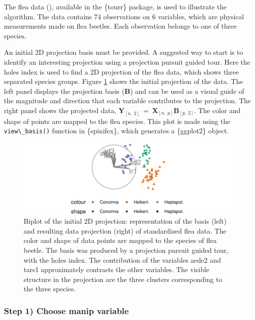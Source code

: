 \documentclass{template/monashthesis}
\begin{document}
The flea data (\textcite{lubischew_use_1962}), available in the \{tourr\} package, is used to illustrate the algorithm. The data contains 74 observations on 6 variables, which are physical measurements made on flea beetles. Each observation belongs to one of three species.

An initial 2D projection basis must be provided. A suggested way to start is to identify an interesting projection using a projection pursuit guided tour. Here the holes index is used to find a 2D projection of the flea data, which shows three separated species groups. Figure \ref{fig:ch3fig1} shows the initial projection of the data. The left panel displays the projection basis (\(\textbf{B}\)) and can be used as a visual guide of the magnitude and direction that each variable contributes to the projection. The right panel shows the projected data, \(\textbf{Y}_{[n,~2]} ~=~ \textbf{X}_{[n,~p]} \textbf{B}_{[p,~2]}\). The color and shape of points are mapped to the flea species. This plot is made using the \texttt{view\textbackslash{}\_basis()} function in \{spinifex\}, which generates a \{ggplot2\} \autocite{wickham_ggplot2_2016} object.

\begin{figure}

{\centering \includegraphics[width=1\linewidth,]{./figures_from_script/ch3_fig1_biplot} 

}

\caption{Biplot of the initial 2D projection: representation of the basis (left) and resulting data projection (right) of standardized flea data. The color and shape of data points are mapped to the species of flea beetle. The basis was produced by a projection pursuit guided tour, with the holes index. The contribution of the variables aede2 and tars1 approximately contrasts the other variables. The visible structure in the projection are the three clusters corresponding to the three species.}\label{fig:ch3fig1}
\end{figure}

\hypertarget{step-1-choose-manip-variable}{%
\subsubsection{Step 1) Choose manip variable}\label{step-1-choose-manip-variable}}
\end{document}

